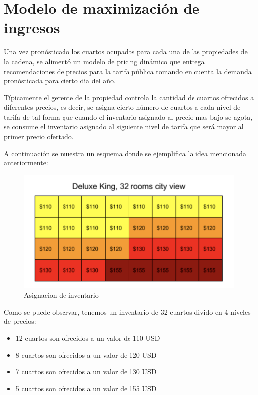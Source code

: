 \section*{Modelo de maximización de ingresos}

Una vez pronósticado los cuartos ocupados para cada una de las propiedades de la cadena, se alimentó un modelo de pricing dinámico que entrega recomendaciones de precios para la tarifa pública tomando en cuenta la demanda pronósticada para cierto día del año.

Típicamente el gerente de la propiedad controla la cantidad de cuartos ofrecidos a diferentes precios, es decir, se asigna cierto número de cuartos a cada nível de tarifa de tal forma que cuando el inventario asignado al precio mas bajo se agota, se consume el inventario asignado al siguiente nivel de tarifa que será mayor al primer precio ofertado.

A continuación se muestra un esquema donde se ejemplifica la idea mencionada anteriormente:

\begin{figure}[H]
  \includegraphics[width=\linewidth]{Figures/buckets.png}
  \caption{Asignacion de inventario}
  \label{fig:Asignacion de Inventario}
\end{figure}

Como se puede observar, tenemos un inventario de 32 cuartos divido en 4 níveles de precios:
\begin{itemize}[noitemsep]
\item 12 cuartos son ofrecidos a un valor de 110 USD
\item 8 cuartos son ofrecidos a un valor de 120 USD
\item 7 cuartos son ofrecidos a un valor de 130 USD
\item 5 cuartos son ofrecidos a un valor de 155 USD
\end{itemize}


